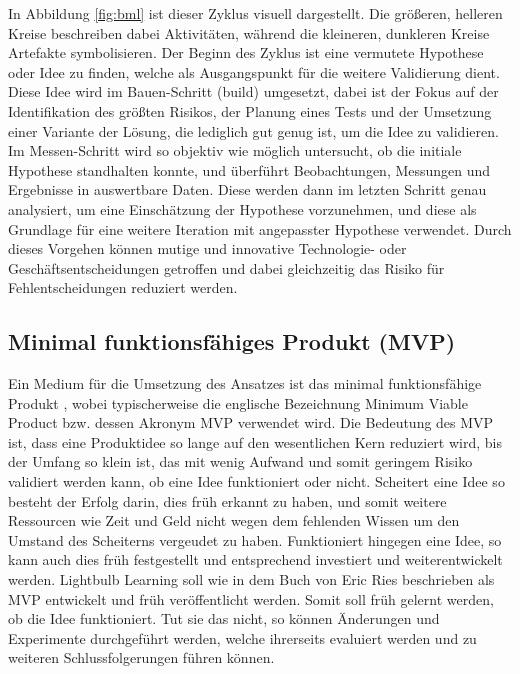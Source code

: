 \noindent In Abbildung \ref{fig:bml} ist dieser Zyklus visuell dargestellt. Die größeren, helleren Kreise beschreiben dabei Aktivitäten, während die kleineren, dunkleren Kreise Artefakte symbolisieren. Der Beginn des Zyklus ist eine vermutete Hypothese oder Idee zu finden, welche als Ausgangspunkt für die weitere Validierung dient. Diese Idee wird im Bauen-Schritt (build) umgesetzt, dabei ist der Fokus auf der Identifikation des größten Risikos, der Planung eines Tests und der Umsetzung einer Variante der Lösung, die lediglich gut genug ist, um die Idee zu validieren. Im Messen-Schritt wird so objektiv wie möglich untersucht, ob die initiale Hypothese standhalten konnte, und überführt Beobachtungen, Messungen und Ergebnisse in auswertbare Daten. Diese werden dann im letzten Schritt genau analysiert, um eine Einschätzung der Hypothese vorzunehmen, und diese als Grundlage für eine weitere Iteration mit angepasster Hypothese verwendet. Durch dieses Vorgehen können mutige und innovative Technologie- oder Geschäftsentscheidungen getroffen und dabei gleichzeitig das Risiko für Fehlentscheidungen reduziert werden.

\subsection{Minimal funktionsfähiges Produkt (MVP)}
\label{sub:mvp}
Ein Medium für die Umsetzung des Ansatzes ist das minimal funktionsfähige Produkt \cite[vgl.][S. 96]{ries2011lean}, wobei typischerweise die englische Bezeichnung Minimum Viable Product bzw. dessen Akronym MVP verwendet wird. Die Bedeutung des MVP ist, dass eine Produktidee so lange auf den wesentlichen Kern reduziert wird, bis der Umfang so klein ist, das mit wenig Aufwand und somit geringem Risiko validiert werden kann, ob eine Idee funktioniert oder nicht. Scheitert eine Idee so besteht der Erfolg darin, dies früh erkannt zu haben, und somit weitere Ressourcen wie Zeit und Geld nicht wegen dem fehlenden Wissen um den Umstand des Scheiterns vergeudet zu haben. Funktioniert hingegen eine Idee, so kann auch dies früh festgestellt und entsprechend investiert und weiterentwickelt werden. Lightbulb Learning soll wie in dem Buch von Eric Ries beschrieben als MVP entwickelt und früh veröffentlicht werden. Somit soll früh gelernt werden, ob die Idee funktioniert. Tut sie das nicht, so können Änderungen und Experimente durchgeführt werden, welche ihrerseits evaluiert werden und zu weiteren Schlussfolgerungen führen können.

